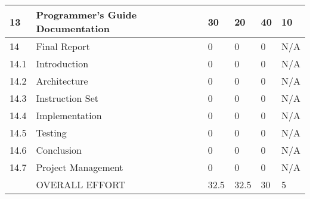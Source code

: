\begin{table}[!h]
\begin{tabular}{p{0.8cm}p{\textwidth-10.2cm}p{1.7cm}p{1.7cm}p{1.7cm}p{1.7cm}}
13   & Programmer's Guide Documentation			& 30	& 20	& 40 	& 10 \\ \hline 
14    & Final Report					& 0	& 0	& 0 	& N/A \\  
14.1  & Introduction 					& 0	& 0	& 0 	& N/A \\  
14.2  & Architecture 					& 0	& 0	& 0 	& N/A \\  
14.3  & Instruction Set 				& 0	& 0	& 0 	& N/A \\  
14.4  & Implementation 					& 0	& 0	& 0 	& N/A \\  
14.5  & Testing 					& 0	& 0	& 0 	& N/A \\  
14.6  & Conclusion 					& 0	& 0	& 0 	& N/A \\  
14.7  & Project Management 				& 0	& 0	& 0 	& N/A \\ \hline 
      &  OVERALL EFFORT					& 32.5	& 32.5	& 30 	& 5 \\ \hline 
\end{tabular}
\end{table}
